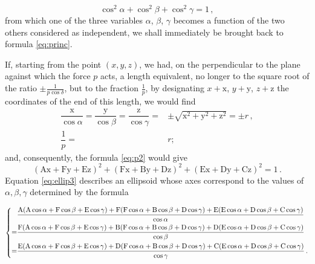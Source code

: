 \documentclass[leqno,openright,smallroyalvopaper,8pt,twoside,showtrims]{memoir}
\begin{document}
\begin{equation}\label{eq:cos1}
\cos^2\alpha+\cos^2\beta+\cos^2\gamma = 1\,,
\end{equation}
from which one of the three variables $\alpha$, $\beta$, $\gamma$ becomes a function of the two others considered as independent, we shall immediately be brought back to formula \eqref{eq:princ}.

If, starting from the point $(x, y, z)$, we had, on the perpendicular to the plane against which the force $p$ acts, a length equivalent, no longer to the square root of the ratio $\pm \frac{1}{p\cos\delta}$, but to the fraction $\frac{1}{p}$, by designating $x + \text{x}$, $y + \text{y}$, $z+ \text{z}$ the coordinates of the end of this length, we would find
\begin{equation}\label{eq:ellip4}
\begin{aligned}
\dfrac{\text{x}}{\cos\alpha}=\dfrac{\text{y}}{\cos\beta}=\dfrac{\text{z}}{\cos\gamma}=&\pm\sqrt{\text{x}^2+\text{y}^2+\text{z}^2}=\pm r\,,\\
\dfrac{1}{p}=&r;
\end{aligned}
\end{equation}
and, consequently, the formula \eqref{eq:p2} would give
\begin{equation}\label{eq:ellip3}
(\text{Ax}+\text{Fy}+\text{Ez})^2+(\text{Fx}+\text{By}+\text{Dz})^2+(\text{Ex}+\text{Dy}+\text{Cz})^2 = 1\,.
\end{equation}
Equation \eqref{eq:ellip3} describes an ellipsoid whose axes correspond to the values of $\alpha,\beta,\gamma$ determined by the formula

\begin{scriptsize}
\begin{equation}
\begin{dcases}
\begin{aligned}
&\dfrac{\text{A}(\text{A}\cos\alpha+\text{F}\cos\beta+\text{E}\cos\gamma)+\text{F}(\text{F}\cos\alpha+\text{B}\cos\beta+\text{D}\cos\gamma)+\text{E}(\text{E}\cos\alpha+\text{D}\cos\beta+\text{C}\cos\gamma)}{\cos\alpha}\\
=&\dfrac{\text{F}(\text{A}\cos\alpha+\text{F}\cos\beta+\text{E}\cos\gamma)+\text{B}(\text{F}\cos\alpha+\text{B}\cos\beta+\text{D}\cos\gamma)+\text{D}(\text{E}\cos\alpha+\text{D}\cos\beta+\text{C}\cos\gamma)}{\cos\beta}\\
=&\dfrac{\text{E}(\text{A}\cos\alpha+\text{F}\cos\beta+\text{E}\cos\gamma)+\text{D}(\text{F}\cos\alpha+\text{B}\cos\beta+\text{D}\cos\gamma)+\text{C}(\text{E}\cos\alpha+\text{D}\cos\beta+\text{C}\cos\gamma)}{\cos\gamma}\,.
\end{aligned}
\end{dcases}
\end{equation}
\end{scriptsize}
\end{document}
